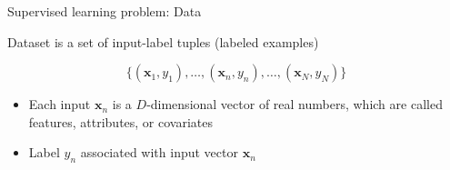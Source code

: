 \documentclass[12pt,aspectratio=169,handout]{beamer}
\begin{document}
%
%
%
%
%
%	


%	
%
%	


\begin{frame}{Supervised learning problem: Data}

Dataset is a set of input-label tuples (labeled examples)

$$
\{(\mathbf{x}_1, y_1), \dots,  (\mathbf{x}_n, y_n), \dots,  (\mathbf{x}_N, y_N)\}
$$


\begin{itemize}
\item Each input $\mathbf{x}_n$ is a $D$-dimensional vector of real numbers, which are called features, attributes, or covariates
\item Label $y_n$ associated with input vector $\mathbf{x}_n$
\end{itemize}

	
\end{frame}

%
%
%
%
\end{document}
